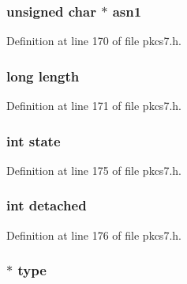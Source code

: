 \subsubsection[{\texorpdfstring{asn1}{asn1}}]{\setlength{\rightskip}{0pt plus 5cm}unsigned char $\ast$ asn1}\hypertarget{structpkcs7__st_aeb68d4c115a405d4de8fd360d5871ec9}{}\label{structpkcs7__st_aeb68d4c115a405d4de8fd360d5871ec9}


Definition at line 170 of file pkcs7.\+h.

\subsubsection[{\texorpdfstring{length}{length}}]{\setlength{\rightskip}{0pt plus 5cm}long length}\hypertarget{structpkcs7__st_ae2b29049fcd8b777a54a1529743b2390}{}\label{structpkcs7__st_ae2b29049fcd8b777a54a1529743b2390}


Definition at line 171 of file pkcs7.\+h.

\subsubsection[{\texorpdfstring{state}{state}}]{\setlength{\rightskip}{0pt plus 5cm}int state}\hypertarget{structpkcs7__st_a89f234133d3efe315836311cbf21c64b}{}\label{structpkcs7__st_a89f234133d3efe315836311cbf21c64b}


Definition at line 175 of file pkcs7.\+h.

\subsubsection[{\texorpdfstring{detached}{detached}}]{\setlength{\rightskip}{0pt plus 5cm}int detached}\hypertarget{structpkcs7__st_a485cdcdb542bd4408d5f38ebcdfb9579}{}\label{structpkcs7__st_a485cdcdb542bd4408d5f38ebcdfb9579}


Definition at line 176 of file pkcs7.\+h.

\subsubsection[{\texorpdfstring{type}{type}}]{ $\ast$ type}\hypertarget{structpkcs7__st_a208650820ad37e29d3433d9f20665c28}{}\label{structpkcs7__st_a208650820ad37e29d3433d9f20665c28}



